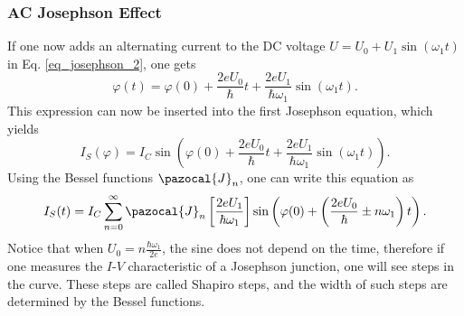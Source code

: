 \documentclass[a4paper,10pt]{article}
\begin{document}
\subsubsection*{AC Josephson Effect} %
If one now adds an alternating current to the DC voltage $U = U_0 + U_1 \sin(\omega_1 t)$ in Eq. \ref{eq_josephson_2}, one gets 
\begin{equation}
    \varphi(t) = \varphi(0) + \frac{2 e U_0}{\hbar} t + \frac{2 e U_1}{\hbar \omega_1} \sin(\omega_1 t).
\end{equation}
This expression can now be inserted into the first Josephson equation, which yields 
\begin{equation}
    I_S(\varphi) = I_C \sin \left( \varphi(0) + \frac{2 e U_0}{\hbar} t + \frac{2 e U_1}{\hbar \omega_1} \sin(\omega_1 t) \right). 
\end{equation}
Using the Bessel functions $\pazocal{J}_n$, one can write this equation as
\begin{equation}
    I_S(t) = I_C \sum^{\infty}_{n = 0} \pazocal{J}_n \left[ \frac{2 e U_1}{\hbar \omega_1} \right]\sin \left( \varphi(0) + \left(\frac{2 e U_0}{\hbar} \pm n \omega_1 \right)t \right).
\end{equation}
Notice that when  $U_0 = n \frac{\hbar \omega_1}{2e}$, the sine does not depend on the time, therefore if one measures the $I$-$V$ characteristic of a Josephson junction, one will see steps in the curve. These steps are called Shapiro steps, and the width of such steps are determined by the Bessel functions.
\end{document}
